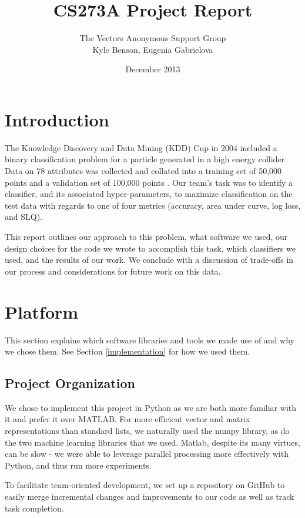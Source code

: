 \documentclass{article}
\title{CS273A Project Report}
\author{The Vectors Anonymous Support Group\\Kyle Benson, Eugenia Gabrielova}
\date{December 2013}
\begin{document}
\maketitle

\section{Introduction}

The Knowledge Discovery and Data Mining (KDD) Cup in 2004 included a binary classification problem for a particle generated in a high energy collider.
Data on 78 attributes was collected and collated into a training set of 50,000 points and a validation set of 100,000 points \cite{kddsubsite}.
Our team's task was to identify a classifier, and its associated hyper-parameters, to maximize classification on the test data with regards to one of four metrics (accuracy, area under curve, log loss, and SLQ).

This report outlines our approach to this problem, what software we used, our design choices for the code we wrote to accomplish this task, which classifiers we used, and the results of our work. We conclude with a discussion of trade-offs in our process and considerations for future work on this data. 


\section{Platform}

This section explains which software libraries and tools we made use of and why we chose them.
See Section \ref{implementation} for how we used them.

\subsection{Project Organization}
We chose to implement this project in Python as we are both more familiar with it and prefer it over MATLAB\textregistered.
For more efficient vector and matrix representations than standard lists, we naturally used the numpy library, as do the two machine learning libraries that we used.
Matlab, despite its many virtues, can be slow - we were able to leverage parallel processing more effectively with Python, and thus run more experiments.

To facilitate team-oriented development, we set up a repository on GitHub to easily merge incremental changes and improvements to our code as well as track task completion. 
\end{document}
